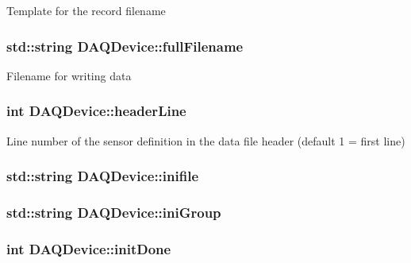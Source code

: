Template for the record filename \hypertarget{classDAQDevice_a1bb9bdd8a55337b40e44d159cb1cc8e5}{
\subsubsection[{full\-Filename}]{\setlength{\rightskip}{0pt plus 5cm}std\-::string D\-A\-Q\-Device\-::full\-Filename\hspace{0.3cm}{\ttfamily [protected]}}}\label{classDAQDevice_a1bb9bdd8a55337b40e44d159cb1cc8e5}
Filename for writing data \hypertarget{classDAQDevice_a06e7f707d2d97b192a4389a0c4fd231d}{
\subsubsection[{header\-Line}]{\setlength{\rightskip}{0pt plus 5cm}int D\-A\-Q\-Device\-::header\-Line\hspace{0.3cm}{\ttfamily [protected]}}}\label{classDAQDevice_a06e7f707d2d97b192a4389a0c4fd231d}
Line number of the sensor definition in the data file header (default 1 = first line) \hypertarget{classDAQDevice_aeacc409b639f3ed09cfdbd9b2c3e7d09}{
\subsubsection[{inifile}]{\setlength{\rightskip}{0pt plus 5cm}std\-::string D\-A\-Q\-Device\-::inifile\hspace{0.3cm}{\ttfamily [protected]}}}\label{classDAQDevice_aeacc409b639f3ed09cfdbd9b2c3e7d09}
\hypertarget{classDAQDevice_a10e5184e28ccafa407167c032f8496ea}{
\subsubsection[{ini\-Group}]{\setlength{\rightskip}{0pt plus 5cm}std\-::string D\-A\-Q\-Device\-::ini\-Group\hspace{0.3cm}{\ttfamily [protected]}}}\label{classDAQDevice_a10e5184e28ccafa407167c032f8496ea}
\hypertarget{classDAQDevice_ad0a7f34f8a98c28fa5660714c048e657}{
\subsubsection[{init\-Done}]{\setlength{\rightskip}{0pt plus 5cm}int D\-A\-Q\-Device\-::init\-Done\hspace{0.3cm}{\ttfamily [protected]}}}\label{classDAQDevice_ad0a7f34f8a98c28fa5660714c048e657}
